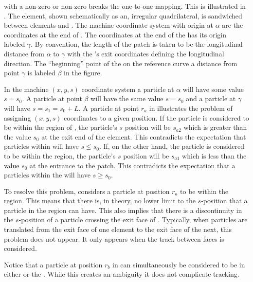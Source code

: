 with a non-zero  or non-zero  breaks the one-to-one mapping. This is
illustrated in .  The  element, shown schematically as an, irregular
quadrilateral, is sandwiched between elements  and . The machine coordinate system
with origin at $\alpha$ are the coordinates at the end of . The coordinates at the end of
the  has its origin labeled $\gamma$. By convention, the length of the patch  is
taken to be the longitudinal distance from $\alpha$ to $\gamma$ with the 's exit
coordinates defining the longitudinal direction. The ``beginning'' point of the  on the
reference curve a distance  from point $\gamma$ is labeled $\beta$ in the figure.

In the machine $(x, y, s)$ coordinate system a particle at $\alpha$ will have some value $s = s_0$. A
particle at point $\beta$ will have the same value $s = s_0$ and a particle at $\gamma$ will have $s
= s_1 = s_0 + L$. A particle at point $r_a$ in  illustrates the problem of
assigning $(x, y, s)$ coordinates to a given position. If the particle is considered to be within
the region of , the particle's $s$ position will be $s_{a2}$ which is greater than the
value $s_0$ at the exit end of the element. This contradicts the expectation that particles within
 will have $s \le s_0$.  If, on the other hand, the particle is considered to be within
the  region, the particle's $s$ position will be $s_{a1}$ which is less than the value
$s_0$ at the entrance to the patch. This contradicts the expectation that a particles within the
 will have $s \ge s_0$.

To resolve this problem, \accellat considers a particle at position $r_a$ to be within the 
region. This means that there is, in theory, no lower limit to the $s$-position that a particle in
the  region can have. This also implies that there is a discontinuity in the $s$-position
of a particle crossing the exit face of . Typically, when particles are translated from the
exit face of one element to the exit face of the next, this  problem does not appear. It
only appears when the track between faces is considered.

Notice that a particle at position $r_b$ in  can simultaneously be considered to
be in either  or the . While this creates an ambiguity it does not complicate
tracking.

